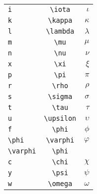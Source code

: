 \documentclass[a4paper,11pt]{scrartcl}
\numberwithin{equation}{section}
\begin{document}
\begin{table}[tb]
\begin{center}
\begin{tabular}{lcr}
    \verb|i|                     &    \verb|\iota|                                                &    $\iota$  \\
    \verb|k|                     &    \verb|\kappa|                                               &    $\kappa$  \\
    \verb|l|                     &    \verb|\lambda|                                              &    $\lambda$  \\
    \verb|m|                     &    \verb|\mu|                                                  &    $\mu$  \\
    \verb|n|                     &    \verb|\nu|                                                  &    $\nu$  \\
    \verb|x|                     &    \verb|\xi|                                                  &    $\xi$  \\
    \verb|p|                     &    \verb|\pi|                                                  &    $\pi$  \\
    \verb|r|                     &    \verb|\rho|                                                 &    $\rho$  \\
    \verb|s|                     &    \verb|\sigma|                                               &    $\sigma$  \\
    \verb|t|                     &    \verb|\tau|                                                 &    $\tau$  \\
    \verb|u|                     &    \verb|\upsilon|                                             &    $\upsilon$  \\
    \verb|f|                     &    \verb|\phi|                                                 &    $\phi$  \\
    \verb|\phi|                  &    \verb|\varphi|                                              &    $\varphi$  \\
    \verb|\varphi|               &    \verb|\phi|                                                 &    \mbox{}  \\
    \verb|c|                     &    \verb|\chi|                                                 &    $\chi$  \\
    \verb|y|                     &    \verb|\psi|                                                 &    $\psi$  \\
    \verb|w|                     &    \verb|\omega|                                               &    $\omega$  \\

\end{tabular}
\end{center}
\end{table}
\end{document}
